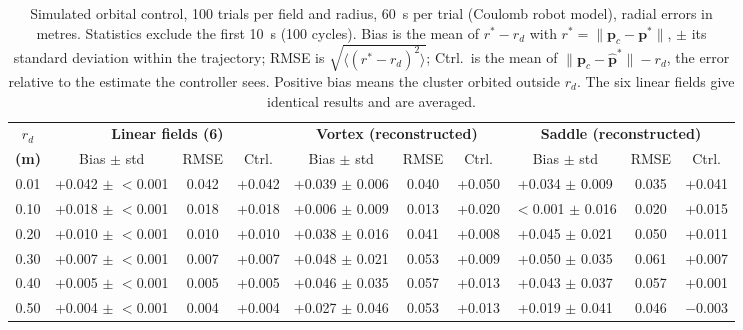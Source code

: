 \begin{table}[!t]
\centering
\footnotesize
\caption{Simulated orbital control, 100 trials per field and radius, 60~s per trial (Coulomb robot model), radial errors in metres. Statistics exclude the first 10~s (100 cycles). Bias is the mean of $r^* - r_d$ with $r^* = \|\mathbf{p}_c - \mathbf{p}^*\|$, $\pm$ its standard deviation within the trajectory; RMSE is $\sqrt{\langle (r^* - r_d)^2 \rangle}$; Ctrl.\ is the mean of $\|\mathbf{p}_c - \hat{\mathbf{p}}^*\| - r_d$, the error relative to the estimate the controller sees. Positive bias means the cluster orbited outside $r_d$. The six linear fields give identical results and are averaged.}
\label{tab:simulation_orbital_results}
\setlength{\tabcolsep}{3pt}
\begin{tabular}{c|ccc|ccc|ccc}
\hline
\textbf{$r_d$} & \multicolumn{3}{c|}{\textbf{Linear fields (6)}} & \multicolumn{3}{c|}{\textbf{Vortex (reconstructed)}} & \multicolumn{3}{c}{\textbf{Saddle (reconstructed)}} \\
\textbf{(m)} & Bias $\pm$ std & RMSE & Ctrl. & Bias $\pm$ std & RMSE & Ctrl. & Bias $\pm$ std & RMSE & Ctrl. \\
\hline
0.01 & +0.042 $\pm$ $<$0.001 & 0.042 & +0.042 & +0.039 $\pm$ 0.006 & 0.040 & +0.050 & +0.034 $\pm$ 0.009 & 0.035 & +0.041 \\
0.10 & +0.018 $\pm$ $<$0.001 & 0.018 & +0.018 & +0.006 $\pm$ 0.009 & 0.013 & +0.020 & $<$0.001 $\pm$ 0.016 & 0.020 & +0.015 \\
0.20 & +0.010 $\pm$ $<$0.001 & 0.010 & +0.010 & +0.038 $\pm$ 0.016 & 0.041 & +0.008 & +0.045 $\pm$ 0.021 & 0.050 & +0.011 \\
0.30 & +0.007 $\pm$ $<$0.001 & 0.007 & +0.007 & +0.048 $\pm$ 0.021 & 0.053 & +0.009 & +0.050 $\pm$ 0.035 & 0.061 & +0.007 \\
0.40 & +0.005 $\pm$ $<$0.001 & 0.005 & +0.005 & +0.046 $\pm$ 0.035 & 0.057 & +0.013 & +0.043 $\pm$ 0.037 & 0.057 & +0.001 \\
0.50 & +0.004 $\pm$ $<$0.001 & 0.004 & +0.004 & +0.027 $\pm$ 0.046 & 0.053 & +0.013 & +0.019 $\pm$ 0.041 & 0.046 & $-$0.003 \\
\hline
\end{tabular}
\end{table}
